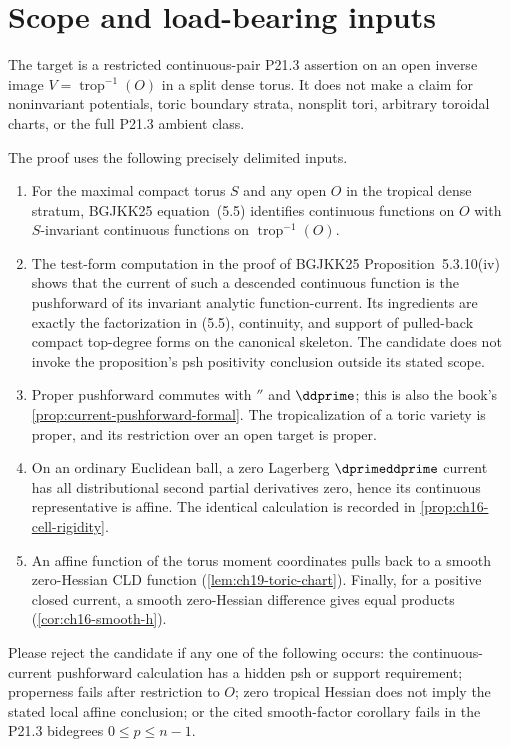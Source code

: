 \section*{Scope and load-bearing inputs}

The target is a restricted continuous-pair P21.3 assertion on an open inverse
image $V=\operatorname{trop}^{-1}(O)$ in a split dense torus.  It does not
make a claim for noninvariant potentials, toric boundary strata, nonsplit
tori, arbitrary toroidal charts, or the full P21.3 ambient class.

The proof uses the following precisely delimited inputs.
\begin{enumerate}
\item For the maximal compact torus $S$ and any open $O$ in the tropical
 dense stratum, BGJKK25 equation~(5.5) identifies continuous functions on
 $O$ with $S$-invariant continuous functions on
 $\operatorname{trop}^{-1}(O)$.
\item The test-form computation in the proof of BGJKK25 Proposition~5.3.10(iv)
 shows that the current of such a descended continuous function is the
 pushforward of its invariant analytic function-current.  Its ingredients are
 exactly the factorization in (5.5), continuity, and support of pulled-back
 compact top-degree forms on the canonical skeleton.  The candidate does not
 invoke the proposition's psh positivity conclusion outside its stated scope.
\item Proper pushforward commutes with $\dprime$ and $\ddprime$; this is also
 the book's \cref{prop:current-pushforward-formal}.  The tropicalization of a
 toric variety is proper, and its restriction over an open target is proper.
\item On an ordinary Euclidean ball, a zero Lagerberg $\dprimeddprime$ current
 has all distributional second partial derivatives zero, hence its continuous
 representative is affine.  The identical calculation is recorded in
 \cref{prop:ch16-cell-rigidity}.
\item An affine function of the torus moment coordinates pulls back to a
 smooth zero-Hessian CLD function (\cref{lem:ch19-toric-chart}).  Finally,
 for a positive closed current, a smooth zero-Hessian difference gives equal
 products (\cref{cor:ch16-smooth-h}).
\end{enumerate}

Please reject the candidate if any one of the following occurs: the
continuous-current pushforward calculation has a hidden psh or support
requirement; properness fails after restriction to $O$; zero tropical Hessian
does not imply the stated local affine conclusion; or the cited smooth-factor
corollary fails in the P21.3 bidegrees $0\leq p\leq n-1$.
